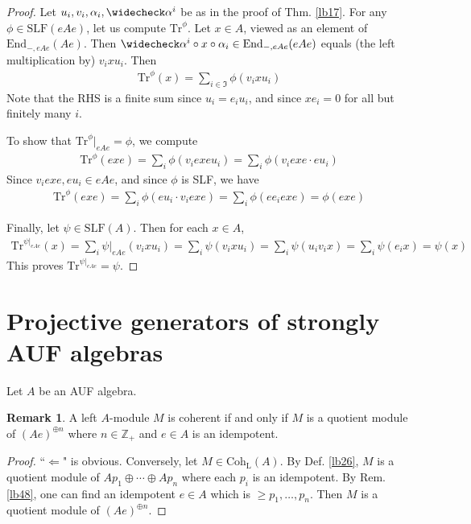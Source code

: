 \documentclass[11pt,b5paper,notitlepage]{article}
\theoremstyle{definition}
\newtheorem{rem}[df]{Remark}
\theoremstyle{plain}
\newcommand{\fk}{\mathfrak}
\newcommand{\wch}{\widecheck}
\newcommand{\Tr}{\mathrm{Tr}}
\newcommand{\End}{\mathrm{End}} %
\newcommand{\Zbb}{\mathbb Z}
\newcommand{\Coh}{\mathrm{Coh}_{\mathrm L}}
\newcommand{\SLF}{\mathrm{SLF}}
\numberwithin{equation}{section}
\begin{document}
\begin{proof}
Let $u_i,v_i,\alpha_i,\wch\alpha^i$ be as in the proof of Thm. \ref{lb17}. For any $\phi\in\SLF(eAe)$, let us compute $\Tr^\phi$. Let $x\in A$, viewed as an element of $\End_{-,eAe}(Ae)$. Then $\wch\alpha^i\circ x\circ\alpha_i\in\End_{-,eAe}(eAe)$ equals (the left multiplication by) $v_ixu_i$. Then
\begin{align}
\Tr^\phi(x)=\sum_{i\in\fk I}\phi(v_ixu_i)
\end{align}
Note that the RHS is a finite sum since $u_i=e_iu_i$, and since $xe_i=0$ for all but finitely many $i$. 

To show that $\Tr^\phi|_{eAe}=\phi$, we compute
\begin{align*}
\Tr^\phi(exe)=\sum_i\phi(v_iexeu_i)=\sum_i\phi(v_iexe\cdot eu_i)
\end{align*}
Since $v_iexe,eu_i\in eAe$, and since $\phi$ is SLF, we have
\begin{align*}
\Tr^\phi(exe)=\sum_i\phi(eu_i\cdot v_iexe)=\sum_i\phi(ee_iexe)=\phi(exe)
\end{align*}

Finally, let $\psi\in\SLF(A)$. Then for each $x\in A$,
\begin{align*}
\Tr^{\psi|_{eAe}}(x)=\sum_i\psi|_{eAe}(v_ixu_i)=\sum_i\psi(v_ixu_i)=\sum_i\psi(u_iv_ix)=\sum_i\psi(e_ix)=\psi(x)
\end{align*}
This proves $\Tr^{\psi|_{eAe}}=\psi$.
\end{proof}






\section{Projective generators of strongly AUF algebras}

Let $A$ be an AUF algebra.

\begin{rem}\label{lb35}
A left $A$-module $M$ is coherent if and only if $M$ is a quotient module of $(Ae)^{\oplus n}$ where $n\in\Zbb_+$ and $e\in A$ is an idempotent.
\end{rem}

\begin{proof}
``$\Leftarrow$" is obvious. Conversely, let $M\in\Coh(A)$. By Def. \ref{lb26}, $M$ is a quotient module of $Ap_1\oplus\cdots\oplus Ap_n$ where each $p_i$ is an idempotent. By Rem. \ref{lb48}, one can find an idempotent $e\in A$ which is $\geq p_1,\dots,p_n$. Then $M$ is a quotient module of $(Ae)^{\oplus n}$.
\end{proof}
\end{document}
